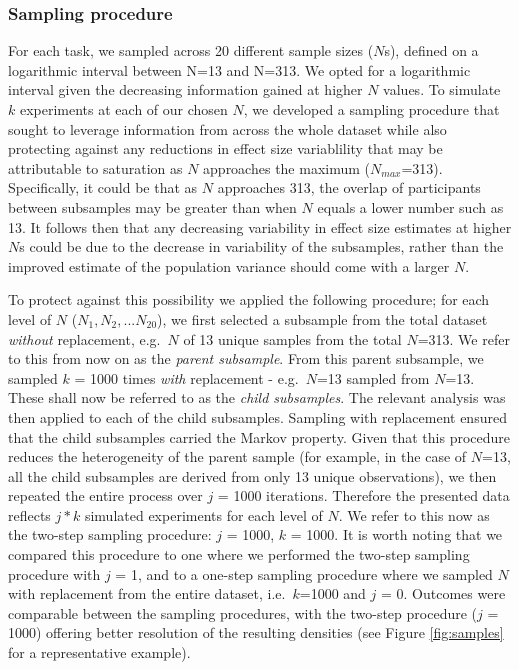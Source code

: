 \documentclass{article}
\begin{document}
\hypertarget{sampling-procedure}{%
\subsubsection{Sampling procedure}\label{sampling-procedure}}

For each task, we sampled across 20 different sample sizes (\(N\)s),
defined on a logarithmic interval between N=13 and N=313. We opted for a
logarithmic interval given the decreasing information gained at higher
\(N\) values. To simulate \(k\) experiments at each of our chosen \(N\),
we developed a sampling procedure that sought to leverage information
from across the whole dataset while also protecting against any
reductions in effect size variablility that may be attributable to
saturation as \(N\) approaches the maximum (\(N_{max}\)=313).
Specifically, it could be that as \(N\) approaches 313, the overlap of
participants between subsamples may be greater than when \(N\) equals a
lower number such as 13. It follows then that any decreasing variability
in effect size estimates at higher \(N\)s could be due to the decrease
in variability of the subsamples, rather than the improved estimate of
the population variance should come with a larger \(N\).

To protect against this possibility we applied the following procedure;
for each level of \(N\) (\(N_{1}, N_{2}, ...N_{20}\)), we first selected
a subsample from the total dataset \emph{without} replacement,
e.g.~\(N\) of 13 unique samples from the total \(N\)=313. We refer to
this from now on as the \emph{parent subsample}. From this parent
subsample, we sampled \(k\) = 1000 times \emph{with} replacement -
e.g.~\(N\)=13 sampled from \(N\)=13. These shall now be referred to as
the \emph{child subsamples}. The relevant analysis was then applied to
each of the child subsamples. Sampling with replacement ensured that the
child subsamples carried the Markov property. Given that this procedure
reduces the heterogeneity of the parent sample (for example, in the case
of \(N\)=13, all the child subsamples are derived from only 13 unique
observations), we then repeated the entire process over \(j\) = 1000
iterations. Therefore the presented data reflects \(j * k\) simulated
experiments for each level of \(N\). We refer to this now as the
two-step sampling procedure: \(j\) = 1000, \(k\) = 1000. It is worth
noting that we compared this procedure to one where we performed the
two-step sampling procedure with \(j\) = 1, and to a one-step sampling
procedure where we sampled \(N\) with replacement from the entire
dataset, i.e.~\(k\)=1000 and \(j\) = 0. Outcomes were comparable between
the sampling procedures, with the two-step procedure (\(j\) = 1000)
offering better resolution of the resulting densities (see Figure
\ref{fig:samples} for a representative example).
\end{document}
